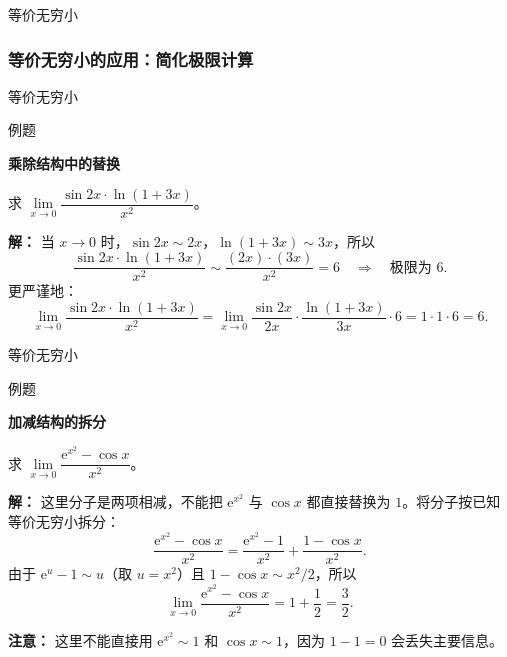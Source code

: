 \documentclass[aspectratio=169,10pt,fontset=fandol]{ctexbeamer}
\newenvironment{custom}[1]{\par\noindent\textbf{#1}\quad}{\par\vspace{0.8em}}
\newcommand{\ee}{\mathrm{e}}
\begin{document}
\begin{frame}[t,fragile]{等价无穷小}
\normalsize
{\normalsize
\subsubsection{等价无穷小的应用：简化极限计算}


}
\end{frame}
\begin{frame}[t,fragile]{等价无穷小}
\normalsize
\begin{block}{例题}
{\normalsize
\textbf{乘除结构中的替换}\par

求 \(\lim\limits_{x \to 0} \dfrac{\sin 2x \cdot \ln(1+3x)}{x^2}\)。

}
\end{block}
\pause
{\normalsize
\textbf{解：}
当 \(x \to 0\) 时，\(\sin 2x \sim 2x\)，\(\ln(1+3x) \sim 3x\)，所以
\[
\dfrac{\sin 2x \cdot \ln(1+3x)}{x^2} \sim \dfrac{(2x) \cdot (3x)}{x^2} = 6 \quad \Rightarrow \quad \text{极限为 } 6.
\]
更严谨地：
\[
\lim_{x \to 0} \dfrac{\sin 2x \cdot \ln(1+3x)}{x^2} = \lim_{x \to 0} \dfrac{\sin 2x}{2x} \cdot \dfrac{\ln(1+3x)}{3x} \cdot 6 = 1 \cdot 1 \cdot 6 = 6.
\]

}
\end{frame}
\begin{frame}[t,fragile]{等价无穷小}
\normalsize
\begin{block}{例题}
{\normalsize
\textbf{加减结构的拆分}\par

求 \(\lim\limits_{x \to 0} \dfrac{\ee^{x^2} - \cos x}{x^2}\)。

}
\end{block}
\pause
{\normalsize
\textbf{解：}
这里分子是两项相减，不能把 \(\ee^{x^2}\) 与 \(\cos x\) 都直接替换为 \(1\)。将分子按已知等价无穷小拆分：
\[
\frac{\ee^{x^2}-\cos x}{x^2}
=\frac{\ee^{x^2}-1}{x^2}+\frac{1-\cos x}{x^2}.
\]
由于 \(\ee^u-1\sim u\)（取 \(u=x^2\)）且 \(1-\cos x\sim x^2/2\)，所以
\[
\lim_{x\to0}\frac{\ee^{x^2}-\cos x}{x^2}
=1+\frac12=\frac32.
\]

\textbf{注意：} 这里不能直接用 \(\ee^{x^2}\sim1\) 和 \(\cos x\sim1\)，因为 \(1-1=0\) 会丢失主要信息。

}
\end{frame}
\end{document}
